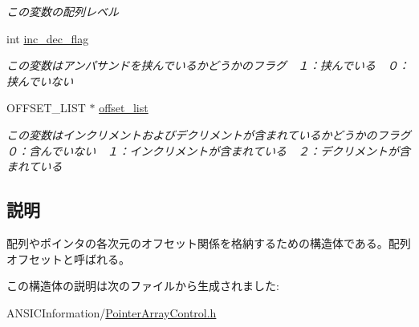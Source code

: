 \begin{DoxyCompactItemize}
\begin{DoxyCompactList}\small\item\em この変数の配列レベル \item\end{DoxyCompactList}\item 
int \hyperlink{structarray__offset_a6a247a3ddfb4d6ae418c81521b3b327e}{inc\_\-dec\_\-flag}\label{structarray__offset_a6a247a3ddfb4d6ae418c81521b3b327e}

\begin{DoxyCompactList}\small\item\em この変数はアンパサンドを挟んでいるかどうかのフラグ　１：挟んでいる　０：挟んでいない \item\end{DoxyCompactList}\item 
OFFSET\_\-LIST $\ast$ \hyperlink{structarray__offset_a3b07fc99c154fe2d99d1a31277897c65}{offset\_\-list}\label{structarray__offset_a3b07fc99c154fe2d99d1a31277897c65}

\begin{DoxyCompactList}\small\item\em この変数はインクリメントおよびデクリメントが含まれているかどうかのフラグ　０：含んでいない　１：インクリメントが含まれている　２：デクリメントが含まれている \item\end{DoxyCompactList}\end{DoxyCompactItemize}


\subsection{説明}
配列やポインタの各次元のオフセット関係を格納するための構造体である。配列オフセットと呼ばれる。 

この構造体の説明は次のファイルから生成されました:\begin{DoxyCompactItemize}
\item 
ANSICInformation/\hyperlink{PointerArrayControl_8h}{PointerArrayControl.h}\end{DoxyCompactItemize}
